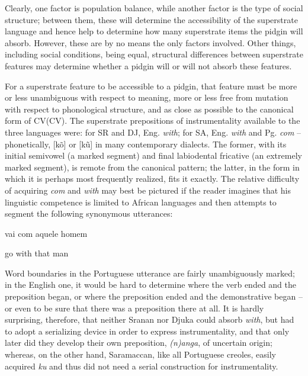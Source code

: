 Clearly, one factor is population balance, while another factor is the type of social structure; between them, these will determine the accessibility of the superstrate language and hence help to deter\-mine how many superstrate items the pidgin will absorb. However, these are by no means the only factors involved. Other things, including social conditions, being equal, structural differences between super\-strate features may determine whether a pidgin will or will not absorb these features.

For a superstrate feature to be accessible to a pidgin, that feature must be more or less unambiguous with respect to meaning, more or less free from mutation with respect to phonological structure, and as close as possible to the canonical form of CV(CV). The superstrate prepositions of instrumentality available to the three languages were: for SR and DJ, Eng. \textit{with}; for SA, Eng. \textit{with} and Pg. \textit{com} -- phonetically, [k\~o] or [k\~u] in many contemporary dialects. The former, with its initial semivowel (a marked segment) and final labiodental fricative (an extremely marked segment), is remote from the canonical pattern; the latter, in the form in which it is perhaps most frequently realized, fits it exactly. The relative difficulty of acquiring \textit{com} and \textit{with} may best be pictured if the reader imagines that his linguistic competence
is limited to African languages and then attempts to segment the following synonymous utterances:

\ea\label{ex:2:234}
vai com aquele homem
\z

\ea\label{ex:2:235}
go with that man
\z

Word boundaries in the Portuguese utterance are fairly un\-ambiguously marked; in the English one, it would be hard to determine where the verb ended and the preposition began, or where the preposi\-tion ended and the demonstrative began -- or even to be sure that there was a preposition there at all. It is hardly surprising, therefore, that neither Sranan nor Djuka could absorb \textit{with}, but had to adopt a serializing device in order to express instrumentality, and that only later did they develop their own preposition, \textit{(n)anga}, of uncertain origin; whereas, on the other hand, Saramaccan, like all Portuguese creoles, easily acquired \textit{ku} and thus did not need a serial construction for instrumentality.

